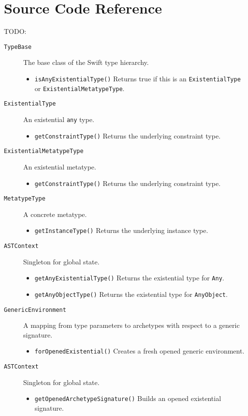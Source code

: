 \documentclass[a4paper,headsepline,bibliography=totoc,toc=flat,fleqn,twoside=semi]{scrbook}
\theoremstyle{definition}
\theoremstyle{definition}
\theoremstyle{definition}
\begin{document}
\section{Source Code Reference}

TODO:

\begin{description}
\item[\texttt{TypeBase}] The base class of the Swift type hierarchy.
\begin{itemize}
\item \texttt{isAnyExistentialType()} Returns true if this is an \texttt{ExistentialType} or \texttt{ExistentialMetatypeType}.
\end{itemize}

\item[\texttt{ExistentialType}] An existential \texttt{any} type.
\begin{itemize}
\item \texttt{getConstraintType()} Returns the underlying constraint type.
\end{itemize}
\item[\texttt{ExistentialMetatypeType}] An existential metatype.
\begin{itemize}
\item \texttt{getConstraintType()} Returns the underlying constraint type.
\end{itemize}

\item[\texttt{MetatypeType}] A concrete metatype.
\begin{itemize}
\item \texttt{getInstanceType()} Returns the underlying instance type.
\end{itemize}

\item[\texttt{ASTContext}] Singleton for global state.
\begin{itemize}
\item \texttt{getAnyExistentialType()} Returns the existential type for \texttt{Any}.
\item \texttt{getAnyObjectType()} Returns the existential type for \texttt{AnyObject}.
\end{itemize}

\item[\texttt{GenericEnvironment}] A mapping from type parameters to archetypes with respect to a generic signature.
\begin{itemize}
\item \texttt{forOpenedExistential()} Creates a fresh opened generic environment.
\end{itemize}

\item[\texttt{ASTContext}] Singleton for global state.
\begin{itemize}
\item \texttt{getOpenedArchetypeSignature()} Builds an opened existential signature.
\end{itemize}
\end{description}
\fi
\end{document}
